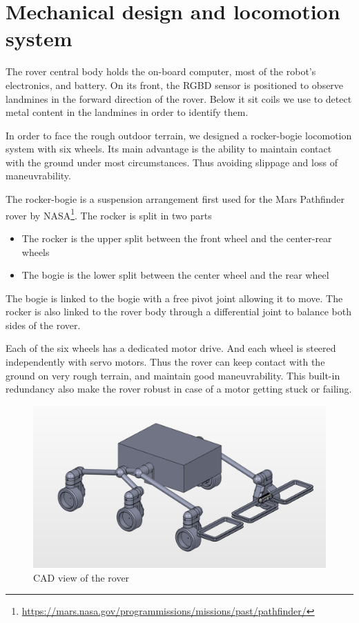 \section{Mechanical design and locomotion system}
The rover central body holds the on-board computer, most of the robot's electronics, and battery.
On its front, the RGBD sensor is positioned to observe landmines in the forward direction of the rover.
Below it sit coils we use to detect metal content in the landmines in order to identify them.

In order to face the rough outdoor terrain, we designed a rocker-bogie locomotion system with six wheels.
Its main advantage is the ability to maintain contact with the ground under most circumstances.
Thus avoiding slippage and loss of maneuvrability.

The rocker-bogie is a suspension arrangement first used for the Mars Pathfinder rover by NASA\footnote{\url{https://mars.nasa.gov/programmissions/missions/past/pathfinder/}}.
The rocker is split in two parts
\begin{itemize}
    \item The rocker is the upper split between the front wheel and the center-rear wheels
    \item The bogie is the lower split between the center wheel and the rear wheel
\end{itemize}
The bogie is linked to the bogie with a free pivot joint allowing it to move.
The rocker is also linked to the rover body through a differential joint to balance both sides of the rover.

Each of the six wheels has a dedicated motor drive.
And each wheel is steered independently with servo motors.
Thus the rover can keep contact with the ground on very rough terrain, and maintain good maneuvrability.
This built-in redundancy also make the rover robust in case of a motor getting stuck or failing.

\begin{figure}[htbp]
   \caption{\label{fig:rover} CAD view of the rover}
   \includegraphics[width=\textwidth]{images/rover}
\end{figure}

